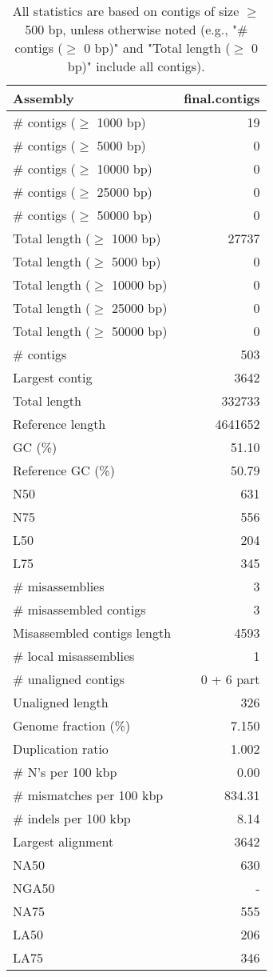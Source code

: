 \documentclass[12pt,a4paper]{article}
\begin{document}
\begin{table}[ht]
\begin{center}
\caption{All statistics are based on contigs of size $\geq$ 500 bp, unless otherwise noted (e.g., "\# contigs ($\geq$ 0 bp)" and "Total length ($\geq$ 0 bp)" include all contigs).}
\begin{tabular}{|l*{1}{|r}|}
\hline
Assembly & final.contigs \\ \hline
\# contigs ($\geq$ 1000 bp) & 19 \\ \hline
\# contigs ($\geq$ 5000 bp) & 0 \\ \hline
\# contigs ($\geq$ 10000 bp) & 0 \\ \hline
\# contigs ($\geq$ 25000 bp) & 0 \\ \hline
\# contigs ($\geq$ 50000 bp) & 0 \\ \hline
Total length ($\geq$ 1000 bp) & 27737 \\ \hline
Total length ($\geq$ 5000 bp) & 0 \\ \hline
Total length ($\geq$ 10000 bp) & 0 \\ \hline
Total length ($\geq$ 25000 bp) & 0 \\ \hline
Total length ($\geq$ 50000 bp) & 0 \\ \hline
\# contigs & 503 \\ \hline
Largest contig & 3642 \\ \hline
Total length & 332733 \\ \hline
Reference length & 4641652 \\ \hline
GC (\%) & 51.10 \\ \hline
Reference GC (\%) & 50.79 \\ \hline
N50 & 631 \\ \hline
N75 & 556 \\ \hline
L50 & 204 \\ \hline
L75 & 345 \\ \hline
\# misassemblies & 3 \\ \hline
\# misassembled contigs & 3 \\ \hline
Misassembled contigs length & 4593 \\ \hline
\# local misassemblies & 1 \\ \hline
\# unaligned contigs & 0 + 6 part \\ \hline
Unaligned length & 326 \\ \hline
Genome fraction (\%) & 7.150 \\ \hline
Duplication ratio & 1.002 \\ \hline
\# N's per 100 kbp & 0.00 \\ \hline
\# mismatches per 100 kbp & 834.31 \\ \hline
\# indels per 100 kbp & 8.14 \\ \hline
Largest alignment & 3642 \\ \hline
NA50 & 630 \\ \hline
NGA50 & - \\ \hline
NA75 & 555 \\ \hline
LA50 & 206 \\ \hline
LA75 & 346 \\ \hline
\end{tabular}
\end{center}
\end{table}
\end{document}
